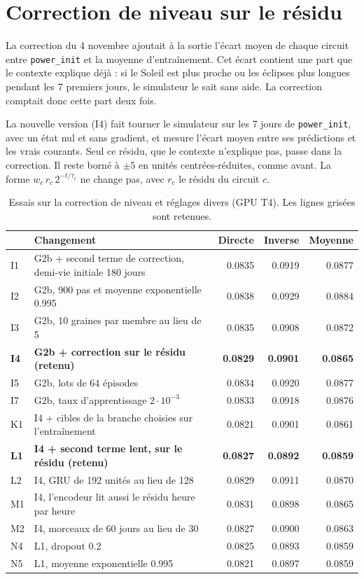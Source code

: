 \documentclass[11pt,a4paper]{article}
\newcommand{\code}[1]{\texttt{#1}}
\begin{document}
\section{Correction de niveau sur le résidu}

La correction du 4 novembre ajoutait à la sortie l'écart moyen de chaque circuit entre \code{power\_init} et la moyenne d'entraînement. Cet écart contient une part que le contexte explique déjà : si le Soleil est plus proche ou les éclipses plus longues pendant les 7 premiers jours, le simulateur le sait sans aide. La correction comptait donc cette part deux fois.

La nouvelle version (I4) fait tourner le simulateur sur les 7 jours de \code{power\_init}, avec un état nul et sans gradient, et mesure l'écart moyen entre ses prédictions et les vrais courants. Seul ce résidu, que le contexte n'explique pas, passe dans la correction. Il reste borné à $\pm 5$ en unités centrées-réduites, comme avant. La forme $w_c\, r_c\, 2^{-t/\tau_c}$ ne change pas, avec $r_c$ le résidu du circuit $c$.

\begin{table}[!htb]
\centering\small
\caption{Essais sur la correction de niveau et réglages divers (GPU T4). Les lignes grisées sont retenues.}
\label{tab:residu}
\begin{tabularx}{\linewidth}{l X r r r}
\toprule
 & Changement & Directe & Inverse & Moyenne \\
\midrule
I1 & G2b + second terme de correction, demi-vie initiale 180 jours & 0.0835 & 0.0919 & 0.0877 \\
I2 & G2b, 900 pas et moyenne exponentielle 0.995 & 0.0838 & 0.0929 & 0.0884 \\
I3 & G2b, 10 graines par membre au lieu de 5 & 0.0835 & 0.0908 & 0.0872 \\
\rowcolor{fond} \textbf{I4} & \textbf{G2b + correction sur le résidu (retenu)} & \textbf{0.0829} & \textbf{0.0901} & \textbf{0.0865} \\
I5 & G2b, lots de 64 épisodes & 0.0834 & 0.0920 & 0.0877 \\
I7 & G2b, taux d'apprentissage $2\cdot10^{-3}$ & 0.0833 & 0.0918 & 0.0876 \\
K1 & I4 + cibles de la branche choisies sur l'entraînement & 0.0821 & 0.0901 & 0.0861 \\
\rowcolor{fond} \textbf{L1} & \textbf{I4 + second terme lent, sur le résidu (retenu)} & \textbf{0.0827} & \textbf{0.0892} & \textbf{0.0859} \\
L2 & I4, GRU de 192 unités au lieu de 128 & 0.0829 & 0.0911 & 0.0870 \\
M1 & I4, l'encodeur lit aussi le résidu heure par heure & 0.0831 & 0.0898 & 0.0865 \\
M2 & I4, morceaux de 60 jours au lieu de 30 & 0.0827 & 0.0900 & 0.0863 \\
N4 & L1, dropout 0.2 & 0.0825 & 0.0893 & 0.0859 \\
N5 & L1, moyenne exponentielle 0.995 & 0.0821 & 0.0897 & 0.0859 \\
\bottomrule
\end{tabularx}
\end{table}
\end{document}
